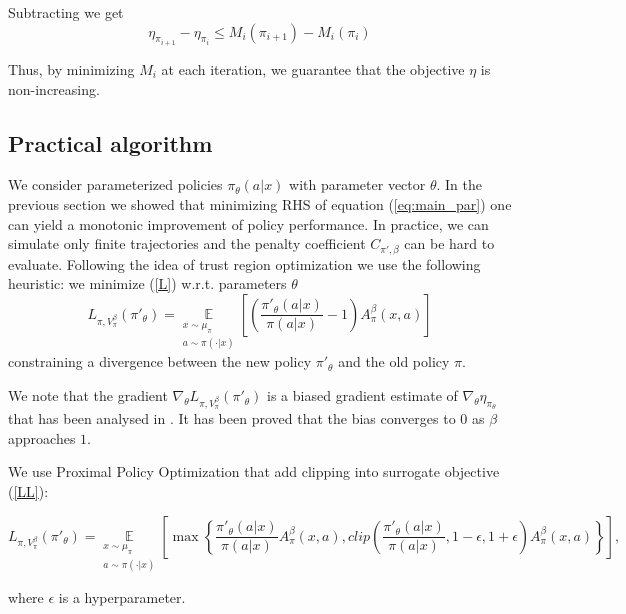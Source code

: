 \documentclass[11pt]{article}
\newcommand{\E}{\mathbb{E}}
\theoremstyle{definition}
\numberwithin{equation}{section}
\begin{document}
Subtracting we get
\begin{equation}
\eta_{\pi_{i+1}} -\eta_{\pi_{i}}\leq M_i(\pi_{i+1})-M_i(\pi_{i})
\end{equation}

Thus, by minimizing $M_i$ at each iteration, we guarantee
that the objective $\eta$ is non-increasing.

\subsection{Practical algorithm}\label{sec:Algorithm}


We consider parameterized policies $\pi_\theta(a|x)$ with parameter vector $\theta$. In the previous section we showed that minimizing RHS of equation (\ref{eq:main_par}) one can yield a monotonic improvement of policy performance. In practice, we can simulate only finite trajectories and the penalty coefficient $C_{ \pi', \beta}$ can be hard to evaluate. Following the idea of trust region optimization we use the following heuristic:  we minimize  (\ref{L}) w.r.t. parameters $\theta$
\begin{equation}\label{LL}
L_{\pi, V_{\pi}^\beta}(\pi'_{\theta}) =\underset{\substack{ x\sim \mu_\pi\\ a\sim \pi(\cdot|x)}}{\E}\left[\left( \frac{\pi'_\theta(a| x)}{\pi(a|x)}-1 \right)A^\beta_\pi(x, a) \right]
\end{equation}
constraining a divergence between the new policy $\pi'_\theta$ and the old policy $\pi$.


We note that the gradient $\nabla_\theta L_{\pi, V_{\pi}^\beta}(\pi'_{\theta})$ is a biased gradient estimate of $\nabla_\theta \eta_{\pi_\theta}$ that has been analysed in \cite{Baxter2001}. It has been proved that the bias converges to $0$ as $\beta$ approaches $1$.

We use Proximal Policy Optimization \cite{Schulman2017} that add clipping into surrogate   objective (\ref{LL}):

\begin{equation}\label{PO}
    L_{\pi, V_{\pi}^\beta}(\pi'_{\theta}) = \underset{\substack{ x\sim \mu_\pi\\ a\sim \pi(\cdot|x)}}{\E}\left[ \max\left\{ \frac{\pi'_{\theta}(a| x)}{\pi(a|x)}A^\beta_{\pi}(x, a) , clip\left(\frac{\pi'_\theta(a| x)}{\pi(a|x)}, 1-\epsilon, 1+\epsilon  \right)  A^\beta_{\pi}(x, a)\right\}\right],
   \end{equation}

where $\epsilon$ is a hyperparameter.
\end{document}
